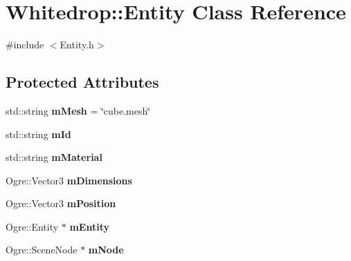 \hypertarget{class_whitedrop_1_1_entity}{\section{Whitedrop\+:\+:Entity Class Reference}
\label{class_whitedrop_1_1_entity}
}


{\ttfamily \#include $<$Entity.\+h$>$}

\subsection*{Protected Attributes}
\begin{DoxyCompactItemize}
\item 
\hypertarget{class_whitedrop_1_1_entity_a1841a6ffdeff94af4e8ad59541b563e9}{std\+::string {\bfseries m\+Mesh} = \char`\"{}cube.\+mesh\char`\"{}}\label{class_whitedrop_1_1_entity_a1841a6ffdeff94af4e8ad59541b563e9}

\item 
\hypertarget{class_whitedrop_1_1_entity_acbc394fbe5ec154070162bda0412c4c4}{std\+::string {\bfseries m\+Id}}\label{class_whitedrop_1_1_entity_acbc394fbe5ec154070162bda0412c4c4}

\item 
\hypertarget{class_whitedrop_1_1_entity_a00bf7eecf6de2f60136a49323e45b9e6}{std\+::string {\bfseries m\+Material}}\label{class_whitedrop_1_1_entity_a00bf7eecf6de2f60136a49323e45b9e6}

\item 
\hypertarget{class_whitedrop_1_1_entity_add651b30e14cf9d64b0c778e0b725e94}{Ogre\+::\+Vector3 {\bfseries m\+Dimensions}}\label{class_whitedrop_1_1_entity_add651b30e14cf9d64b0c778e0b725e94}

\item 
\hypertarget{class_whitedrop_1_1_entity_aee11528773787a391642875de0c7004c}{Ogre\+::\+Vector3 {\bfseries m\+Position}}\label{class_whitedrop_1_1_entity_aee11528773787a391642875de0c7004c}

\item 
\hypertarget{class_whitedrop_1_1_entity_a8b6f04e3940e12810331a63b6d06f17b}{Ogre\+::\+Entity $\ast$ {\bfseries m\+Entity}}\label{class_whitedrop_1_1_entity_a8b6f04e3940e12810331a63b6d06f17b}

\item 
\hypertarget{class_whitedrop_1_1_entity_ade74d176bc52bc5c68869ea8dfe79d59}{Ogre\+::\+Scene\+Node $\ast$ {\bfseries m\+Node}}\label{class_whitedrop_1_1_entity_ade74d176bc52bc5c68869ea8dfe79d59}

\end{DoxyCompactItemize}


